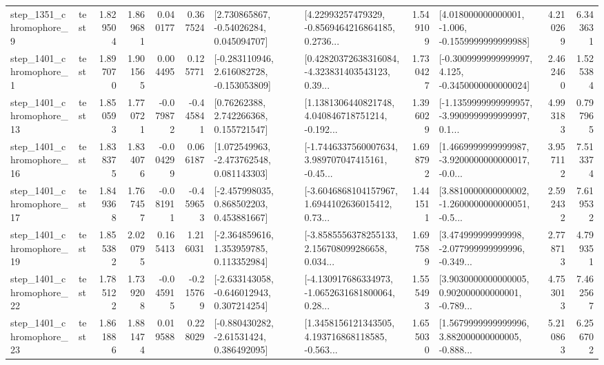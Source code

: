 \begin{tabular}{llrrrrllrlrr}
  step\_1351\_chromophore\_9 &      test &      1.829504 &    1.869681 &      0.040177 &  0.367524 &     [2.730865867, -0.54026284, 0.045094707] &  [4.22993257479329, -0.8569464216864185, 0.2736... &       1.549109 &   [4.018000000000001, -1.006, -0.1559999999999988] &            4.210269 &          6.343631 \\
  step\_1401\_chromophore\_1 &      test &      1.897070 &    1.901565 &      0.004495 &  0.125771 &   [-0.283110946, 2.616082728, -0.153053809] &  [0.42820372638316084, -4.323831403543123, 0.39... &       1.730427 &  [-0.3009999999999997, 4.125, -0.3450000000000024] &            2.462460 &          1.525384 \\
 step\_1401\_chromophore\_13 &      test &      1.850593 &    1.770721 &     -0.079872 & -0.445841 &      [0.76262388, 2.742266368, 0.155721547] &  [1.1381306440821748, 4.040846718751214, -0.192... &       1.396029 &  [-1.1359999999999957, -3.9909999999999997, 0.1... &            4.993183 &          0.797965 \\
 step\_1401\_chromophore\_16 &      test &      1.838375 &    1.834076 &     -0.004299 &  0.066187 &    [1.072549963, -2.473762548, 0.081143303] &  [-1.7446337560007634, 3.989707047415161, -0.45... &       1.698792 &  [1.4669999999999987, -3.9200000000000017, -0.0... &            3.957112 &          7.513374 \\
 step\_1401\_chromophore\_17 &      test &      1.849368 &    1.767457 &     -0.081911 & -0.459653 &    [-2.457998035, 0.868502203, 0.453881667] &  [-3.6046868104157967, 1.6944102636015412, 0.73... &       1.441511 &  [3.8810000000000002, -1.2600000000000051, -0.5... &            2.592432 &          7.619532 \\
 step\_1401\_chromophore\_19 &      test &      1.855382 &    2.020795 &      0.165413 &  1.216031 &    [-2.364859616, 1.353959785, 0.113352984] &  [-3.8585556378255133, 2.156708099286658, 0.034... &       1.697589 &  [3.474999999999998, -2.077999999999996, -0.349... &            2.778713 &          4.799351 \\
 step\_1401\_chromophore\_22 &      test &      1.785122 &    1.739208 &     -0.045915 & -0.215769 &   [-2.633143058, -0.646012943, 0.307214254] &  [-4.130917686334973, -1.0652631681800064, 0.28... &       1.555493 &  [3.9030000000000005, 0.902000000000001, -0.789... &            4.753013 &          7.462567 \\
 step\_1401\_chromophore\_23 &      test &      1.861886 &    1.881474 &      0.019588 &  0.228029 &    [-0.880430282, -2.61531424, 0.386492095] &  [1.3458156121343505, 4.193716868118585, -0.563... &       1.655030 &  [1.5679999999999996, 3.882000000000005, -0.888... &            5.210863 &          6.256702 \\

\end{tabular}
